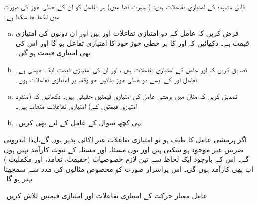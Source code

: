  \quad
قابل مشاہدہ کے امتیازی تفاعلات  ہیں: ( ہلبرٹ فضا میں)   ہر تفاعل کو ان کے خطی جوڑ کی صورت میں لکھا جا سکتا ہے۔ 

\begin{enumerate}[a.]
\item
 فرض کریں کہ عامل  کے دو امتیازی تفاعلات  اور  ہیں اور ان دونوں کی امتیازی قیمت  ہے۔ دکھائیں کہ  اور  کا ہر خطی جوڑ خود  کا امتیازی تفاعل ہو گا اور اس کی  بھی امتیازی قیمت  ہو گی۔
\item
 تصدیق کریں کہ  اور   عامل  کے امتیازی تفاعلات ہیں ، اور ان کی امتیازی قیمت ایک جیسی   ہے۔تفاعل  اور  کے ایسے دو خطی جوڑ بنائیں جو وقفہ  پر  امتیازی تفاعلات  ہوں۔
\end{enumerate}
\begin{enumerate}[a.]
\item
 تصدیق کریں کہ مثال  میں ہرمشی عامل کی امتیازی قیمتیں حقیقی ہیں۔ دکھائیں کہ (منفرد امتیازی قیمتوں کے) امتیازی تفاعلات متعامد ہیں۔ 
\item
 یہی کچھ سوال  کے عامل کے لیے  بھی کریں۔
\end{enumerate}

اگر ہرمشی عامل کا طیف  ہو تو    امتیازی تفاعلات  غیر اکائی پذیر  ہوں گے،لہٰذا      اندرونی ضربیں  غیر موجود ہو سکتی ہیں اور یوں  مسئلہ  اور مسئلہ  کے ثبوت کارآمد نہیں ہوں گے۔ اس کے باوجود ایک لحاظ سے تین لازم خصوصیات (حقیقت، تعامد،  اور مکملیت )  اب بھی کارآمد ہوں گی۔ اس پراسرار صورت کو  مخصوص مثالوں  کی مدد سے سمجھنا بہتر ہو گا۔



عامل معیار حرکت کے امتیازی تفاعلات اور امتیازی قیمتیں تلاش کریں۔

